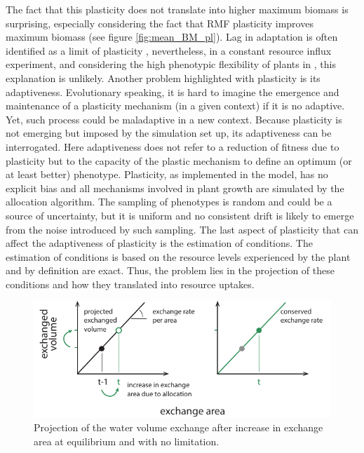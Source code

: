 The fact that this plasticity does not translate into higher maximum biomass is surprising, especially considering the fact that RMF plasticity improves maximum biomass (see figure \ref{fig:mean_BM_pl}). Lag in adaptation is often identified as a limit of plasticity \parencite{dewitt_costs_1998, van_kleunen_constraints_2005}, nevertheless, in a constant resource influx experiment, and considering the high phenotypic flexibility of plants in \model, this explanation is unlikely. Another problem highlighted with plasticity is its adaptiveness. Evolutionary speaking, it is hard to imagine the emergence and maintenance of a plasticity mechanism (in a given context) if it is no adaptive. Yet, such process could be maladaptive in a new context. Because plasticity is not emerging but imposed by the simulation set up, its adaptiveness can be interrogated. Here adaptiveness does not refer to a reduction of fitness due to plasticity but to the capacity of the plastic mechanism to define an optimum (or at least better) phenotype. Plasticity, as implemented in the model, has no explicit bias and all mechanisms involved in plant growth are simulated by the allocation algorithm. The sampling of phenotypes is random and could be a source of uncertainty, but it is uniform and no consistent drift is likely to emerge from the noise introduced by such sampling. The last aspect of plasticity that can affect the adaptiveness of plasticity is the estimation of conditions. The estimation of conditions is based on the resource levels experienced by the plant and by definition are exact. Thus, the problem lies in the projection of these conditions and how they translated into resource uptakes.


\begin{figure}\label{fig:exchange_volume_projection}
\includegraphics[width = \textwidth]{./2_PP/Figures/Concepts/exchange_volume_projection.pdf}
\caption{Projection of the water volume exchange after increase in exchange area at equilibrium and with no limitation.}
\end{figure}

